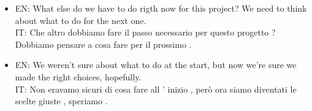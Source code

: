 \begin{itemize}
    \item EN: What else do we have to do rigth now for this project? We need to think about what to do for the next one.\\IT: Che altro dobbiamo fare il passo necessario per questo progetto ? Dobbiamo pensare a cosa fare per il prossimo .

    \item EN: We weren't sure about what to do at the start, but now we're sure we  made the right choices, hopefully.\\IT: Non eravamo sicuri di cosa fare all ' inizio , però ora siamo diventati le scelte giuste , speriamo .
\end{itemize}